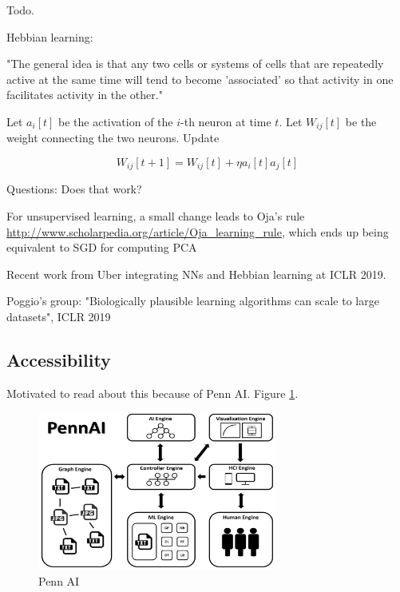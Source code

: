 \documentclass[english]{article}
\begin{document}
\benum 
\item Todo.
\item Hebbian learning:

"The general idea is that any two cells or systems of cells that are repeatedly active at the same time will tend to become 'associated' so that activity in one facilitates activity in the other."

\item 

 Let $a_i[t]$ be the activation of the $i$-th neuron at time $t$. Let $W_{ij}[t]$ be the weight connecting the two neurons. Update

$$W_{ij}[t+1]=W_{ij}[t]+\eta a_i[t]a_j[t]$$

\item Questions: Does that work?

\item For unsupervised learning, a small change leads to Oja's rule \url{http://www.scholarpedia.org/article/Oja_learning_rule}, which ends up being equivalent to SGD for computing PCA


\item Recent work from Uber integrating NNs and Hebbian learning at ICLR 2019. 

Poggio's group: "Biologically plausible learning algorithms can scale to large datasets", ICLR 2019

\eenum 


\subsection{Accessibility}


\benum 
\item Motivated to read about this because of Penn AI. Figure \ref{Penn AI}.

\begin{figure}[h!]
  \centering
  \includegraphics[width=0.7\textwidth]{pennai}
  \caption{Penn AI}
  \label{Penn AI}
\end{figure}
\end{document}
